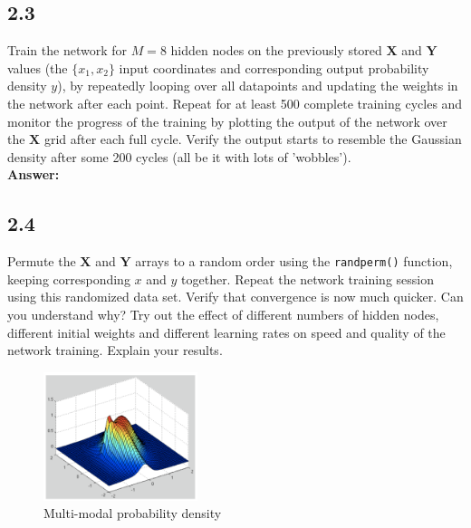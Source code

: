 \documentclass[a4paper]{article}
\begin{document}
\subsection*{2.3}

Train the network for $M = 8$ hidden nodes on the previously stored $\textbf{X}$ and $\textbf{Y}$ values (the $\{ x_1, x_2 \}$ input coordinates and corresponding output probability density $y$), by repeatedly looping over all datapoints and updating the weights in the network after each point. Repeat for at least 500 complete training cycles and monitor the progress of the training by plotting the output of the network over the $\textbf{X}$ grid after each full cycle. Verify the output starts to resemble the Gaussian density after some 200 cycles (all be it with lots of 'wobbles').\\


\textbf{Answer:}\\







\subsection*{2.4}

Permute the $\textbf{X}$ and $\textbf{Y}$ arrays to a random order using the \texttt{randperm()} function, keeping corresponding $x$ and $y$ together. Repeat the network training session using this randomized data set. Verify that convergence is now much quicker. Can you understand why? Try out the effect of different numbers of hidden nodes, different initial weights and different learning rates on speed and quality of the network training. Explain your results.

\begin{figure}[H]
\center
\includegraphics[width=0.4\textwidth]{Images/multi-modal.png}
\caption{Multi-modal probability density}
\label{Fig:multi-modal}
\end{figure}
\end{document}
